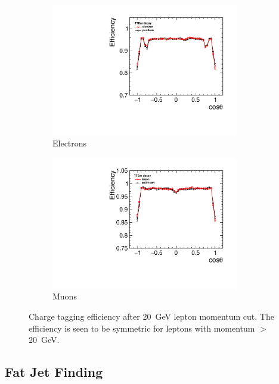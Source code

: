 \begin{figure}
  \centering
  \begin{subfigure}{.5\textwidth}
    \centering
    \includegraphics[width=0.9\textwidth]{TopAnalysis/figures/ElectronEfficiencys_20GeVMCCut.pdf}
    \caption[Charge Tagging Efficiency]{Electrons}
  \end{subfigure}%
  \begin{subfigure}{.5\textwidth}
    \centering
    \includegraphics[width=0.9\textwidth]{TopAnalysis/figures/MuonEfficiencys_20GeVMCCut.pdf}
    \caption[Charge Tagging Efficiency]{Muons}
  \end{subfigure}
  \caption[Charge Tagging Efficiency After 20GeV Lepton Momentum Cut]{Charge tagging efficiency after 20~GeV lepton momentum cut. The efficiency is seen to be symmetric for leptons with momentum $>$ 20~GeV.}
  \label{fig:effienciesWithCuts}
\end{figure}


\subsection{Fat Jet Finding}

